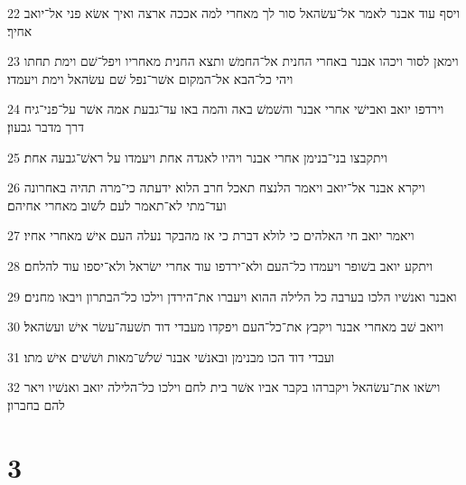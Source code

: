 \par 22 ויסף עוד אבנר לאמר אל־עשׂהאל סור לך מאחרי למה אככה ארצה ואיך אשׂא פני אל־יואב אחיך׃
\par 23 וימאן לסור ויכהו אבנר באחרי החנית אל־החמשׁ ותצא החנית מאחריו ויפל־שׁם וימת תחתו ויהי כל־הבא אל־המקום אשׁר־נפל שׁם עשׂהאל וימת ויעמדו׃
\par 24 וירדפו יואב ואבישׁי אחרי אבנר והשׁמשׁ באה והמה באו עד־גבעת אמה אשׁר על־פני־גיח דרך מדבר גבעון׃
\par 25 ויתקבצו בני־בנימן אחרי אבנר ויהיו לאגדה אחת ויעמדו על ראשׁ־גבעה אחת׃
\par 26 ויקרא אבנר אל־יואב ויאמר הלנצח תאכל חרב הלוא ידעתה כי־מרה תהיה באחרונה ועד־מתי לא־תאמר לעם לשׁוב מאחרי אחיהם׃
\par 27 ויאמר יואב חי האלהים כי לולא דברת כי אז מהבקר נעלה העם אישׁ מאחרי אחיו׃
\par 28 ויתקע יואב בשׁופר ויעמדו כל־העם ולא־ירדפו עוד אחרי ישׂראל ולא־יספו עוד להלחם׃
\par 29 ואבנר ואנשׁיו הלכו בערבה כל הלילה ההוא ויעברו את־הירדן וילכו כל־הבתרון ויבאו מחנים׃
\par 30 ויואב שׁב מאחרי אבנר ויקבץ את־כל־העם ויפקדו מעבדי דוד תשׁעה־עשׂר אישׁ ועשׂהאל׃
\par 31 ועבדי דוד הכו מבנימן ובאנשׁי אבנר שׁלשׁ־מאות ושׁשׁים אישׁ מתו׃
\par 32 וישׂאו את־עשׂהאל ויקברהו בקבר אביו אשׁר בית לחם וילכו כל־הלילה יואב ואנשׁיו ויאר להם בחברון׃

\chapter{3}

